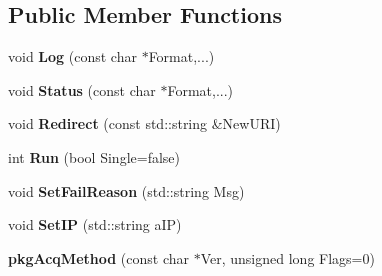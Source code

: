 \subsection*{\-Public \-Member \-Functions}
\begin{DoxyCompactItemize}
\item 
void {\bfseries \-Log} (const char $\ast$\-Format,...)\label{classpkgAcqMethod_a2d2945c5952955d702f894ff0e4fc618}

\item 
void {\bfseries \-Status} (const char $\ast$\-Format,...)\label{classpkgAcqMethod_a3a53850c6b48deb4bd6243b0095d7521}

\item 
void {\bfseries \-Redirect} (const std\-::string \&\-New\-U\-R\-I)\label{classpkgAcqMethod_a9f72145ae2ea3bfb9e7fa0cef7becee9}

\item 
int {\bfseries \-Run} (bool \-Single=false)\label{classpkgAcqMethod_ae2188bbaec10e68b1232221544b6bfdb}

\item 
void {\bfseries \-Set\-Fail\-Reason} (std\-::string \-Msg)\label{classpkgAcqMethod_a3f48a633c4713eab7cd6c3fa35df54cf}

\item 
void {\bfseries \-Set\-I\-P} (std\-::string a\-I\-P)\label{classpkgAcqMethod_a2734b9c8daa6d17a8663b84c43f7bf24}

\item 
{\bfseries pkg\-Acq\-Method} (const char $\ast$\-Ver, unsigned long \-Flags=0)\label{classpkgAcqMethod_ad18deec626531407f841fcaf401ec631}

\end{DoxyCompactItemize}
